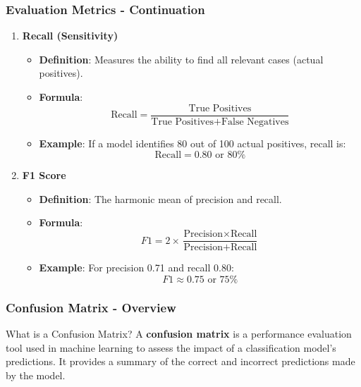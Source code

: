 \documentclass[aspectratio=169]{beamer}
\begin{document}
\begin{frame}[fragile]
    \frametitle{Evaluation Metrics - Continuation}
    \begin{enumerate}[resume]
        \item \textbf{Recall (Sensitivity)}
            \begin{itemize}
                \item \textbf{Definition}: Measures the ability to find all relevant cases (actual positives).
                \item \textbf{Formula}:
                \begin{equation}
                \text{Recall} = \frac{\text{True Positives}}{\text{True Positives} + \text{False Negatives}}
                \end{equation}
                \item \textbf{Example}: If a model identifies 80 out of 100 actual positives, recall is:
                \begin{equation}
                \text{Recall} = 0.80 \text{ or } 80\%
                \end{equation}
            \end{itemize}

        \item \textbf{F1 Score}
            \begin{itemize}
                \item \textbf{Definition}: The harmonic mean of precision and recall.
                \item \textbf{Formula}:
                \begin{equation}
                F1 = 2 \times \frac{\text{Precision} \times \text{Recall}}{\text{Precision} + \text{Recall}}
                \end{equation}
                \item \textbf{Example}: For precision 0.71 and recall 0.80:
                \begin{equation}
                F1 \approx 0.75 \text{ or } 75\%
                \end{equation}
            \end{itemize}
    \end{enumerate}
\end{frame}

\begin{frame}[fragile]
    \frametitle{Confusion Matrix - Overview}
    \begin{block}{What is a Confusion Matrix?}
        A \textbf{confusion matrix} is a performance evaluation tool used in machine learning to assess the impact of a classification model's predictions. It provides a summary of the correct and incorrect predictions made by the model.
    \end{block}
\end{frame}
\end{document}
